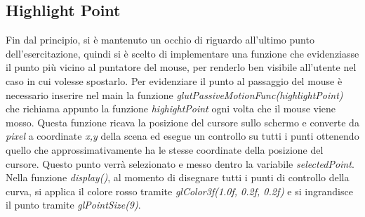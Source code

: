 \subsection{Highlight Point}
Fin dal principio, si è mantenuto un occhio di riguardo all'ultimo punto dell'esercitazione, quindi si è scelto di implementare una funzione che evidenziasse il punto più vicino al puntatore del mouse, per renderlo ben visibile all'utente nel caso in cui volesse spostarlo.
Per evidenziare il punto al passaggio del mouse è necessario inserire nel main la funzione \textit{glutPassiveMotionFunc(highlightPoint)} che richiama appunto la funzione \textit{highightPoint} ogni volta che il mouse viene mosso. Questa funzione ricava la posizione del cursore sullo schermo e converte da \textit{pixel} a coordinate \textit{{x,y}} della scena ed esegue un controllo su tutti i punti ottenendo quello che approssimativamente ha le stesse coordinate della posizione del cursore. Questo punto verrà selezionato e messo dentro la variabile \textit{selectedPoint}. Nella funzione \textit{display()}, al momento di disegnare tutti i punti di controllo della curva, si applica il colore rosso tramite \textit{glColor3f(1.0f, 0.2f, 0.2f)} e si ingrandisce il punto tramite \textit{glPointSize(9)}.

